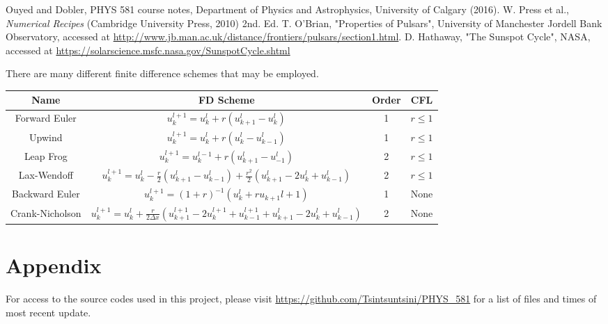 \documentclass[twocolumn]{article}
\begin{document}
\begin{thebibliography}{00}
	Ouyed and Dobler, PHYS 581 course notes, Department of Physics and Astrophysics, University of Calgary (2016).
	W. Press et al., \emph{Numerical Recipes} (Cambridge University Press, 2010) 2nd. Ed.
	T. O'Brian, "Properties of Pulsars", University of Manchester Jordell Bank Observatory, accessed at \url{http://www.jb.man.ac.uk/distance/frontiers/pulsars/section1.html}.
	D. Hathaway, "The Sunspot Cycle",  NASA, accessed at \url{ https://solarscience.msfc.nasa.gov/SunspotCycle.shtml}
\end{thebibliography}

There are many different finite difference schemes that may be employed. 

\begin{table*}
	\begin{center}
		\begin{tabular}{|c|c|c|c|}
			\hline
			Name & FD Scheme & Order & CFL \\
			\hline
			Forward Euler & $u_{k}^{l+1} = u_k^l +r(u_{k+1}^l - u_k^l) $ & 1 & $r\leq 1$ \\
			\hline
			Upwind & $ u_{k}^{l+1} = u_k^l +r(u_{k}^l - u_{k-1}^l) $ & 1 & $r\leq 1$ \\
			\hline
			Leap Frog & $u_{k}^{l+1} = u_k^{l-1} +r(u_{k+1}^l - u_{-1}^l) $ & 2 & $r\leq 1$ \\
			\hline
			Lax-Wendoff & $u_{k}^{l+1} = u_k^l - \frac{r}{2}(u_{k+1}^l - u_{k-1}^l) + \frac{r^2}{2}(u_{k+1}^l - 2u_k^l + u_{k-1}^l) $ & 2 & $r\leq 1$ \\
			\hline
			Backward Euler & $u_{k}^{l+1} = (1 + r)^{-1}(u_k^l + ru_{k+1}{l+1}) $ & 1 &  None\\
			\hline
			Crank-Nicholson & $u_{k}^{l+1} = u_k^l +\frac{r}{2 \Delta x}(u_{k+1}^{l+1} - 2u_k^{l+1} +u_{k-1}^{l+1} + u_{k+1}^l -2u_k^l + u_{k-1}^l) $ & 2 & None \\
			\hline
		\end{tabular}
	\end{center}
\end{table*}

\section{Appendix}
For access to the source codes used in this project, please visit \url{https://github.com/Tsintsuntsini/PHYS_581} for a list of files and times of most recent update.
	
\end{document}
